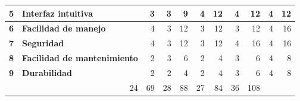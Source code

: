 \begin{table}[H]
\begin{tabular}{|c|c|c|c|c|c|c|c|c|c|c|}
		\hline
		\textbf{5} & \multicolumn{1}{l|}{\textbf{Interfaz intuitiva}} & \multicolumn{1}{r|}{3} & \multicolumn{1}{r|}{\cellcolor[rgb]{ .949,  .863,  .859}3} & \multicolumn{1}{r|}{9} & \multicolumn{1}{r|}{\cellcolor[rgb]{ .863,  .902,  .945}4} & \multicolumn{1}{r|}{12} & \multicolumn{1}{r|}{\cellcolor[rgb]{ .922,  .945,  .871}4} & \multicolumn{1}{r|}{12} & \multicolumn{1}{r|}{\cellcolor[rgb]{ .992,  .914,  .851}4} & \multicolumn{1}{r|}{12} \bigstrut\\
		\hline
		\textbf{6} & \multicolumn{1}{l|}{\textbf{Facilidad de manejo }} & \multicolumn{1}{r|}{4} & \multicolumn{1}{r|}{\cellcolor[rgb]{ .949,  .863,  .859}3} & \multicolumn{1}{r|}{12} & \multicolumn{1}{r|}{\cellcolor[rgb]{ .863,  .902,  .945}3} & \multicolumn{1}{r|}{12} & \multicolumn{1}{r|}{\cellcolor[rgb]{ .922,  .945,  .871}3} & \multicolumn{1}{r|}{12} & \multicolumn{1}{r|}{\cellcolor[rgb]{ .992,  .914,  .851}4} & \multicolumn{1}{r|}{16} \bigstrut\\
		\hline
		\textbf{7} & \multicolumn{1}{l|}{\textbf{Seguridad}} & \multicolumn{1}{r|}{4} & \multicolumn{1}{r|}{\cellcolor[rgb]{ .949,  .863,  .859}3} & \multicolumn{1}{r|}{12} & \multicolumn{1}{r|}{\cellcolor[rgb]{ .863,  .902,  .945}3} & \multicolumn{1}{r|}{12} & \multicolumn{1}{r|}{\cellcolor[rgb]{ .922,  .945,  .871}4} & \multicolumn{1}{r|}{16} & \multicolumn{1}{r|}{\cellcolor[rgb]{ .992,  .914,  .851}4} & \multicolumn{1}{r|}{16} \bigstrut\\
		\hline
		\textbf{8} & \multicolumn{1}{l|}{\textbf{Facilidad de mantenimiento}} & \multicolumn{1}{r|}{2} & \multicolumn{1}{r|}{\cellcolor[rgb]{ .949,  .863,  .859}3} & \multicolumn{1}{r|}{6} & \multicolumn{1}{r|}{\cellcolor[rgb]{ .863,  .902,  .945}2} & \multicolumn{1}{r|}{4} & \multicolumn{1}{r|}{\cellcolor[rgb]{ .922,  .945,  .871}3} & \multicolumn{1}{r|}{6} & \multicolumn{1}{r|}{\cellcolor[rgb]{ .992,  .914,  .851}4} & \multicolumn{1}{r|}{8} \bigstrut\\
		\hline
		\textbf{9} & \multicolumn{1}{l|}{\textbf{Durabilidad}} & \multicolumn{1}{r|}{2} & \multicolumn{1}{r|}{\cellcolor[rgb]{ .949,  .863,  .859}2} & \multicolumn{1}{r|}{4} & \multicolumn{1}{r|}{\cellcolor[rgb]{ .863,  .902,  .945}2} & \multicolumn{1}{r|}{4} & \multicolumn{1}{r|}{\cellcolor[rgb]{ .922,  .945,  .871}3} & \multicolumn{1}{r|}{6} & \multicolumn{1}{r|}{\cellcolor[rgb]{ .992,  .914,  .851}4} & \multicolumn{1}{r|}{8} \bigstrut\\
		\hline
		\rowcolor[rgb]{ .851,  .851,  .851} \multicolumn{3}{|c|}{\textbf{Suma}} & \multicolumn{1}{r|}{24} & \multicolumn{1}{r|}{69} & \multicolumn{1}{r|}{28} & \multicolumn{1}{r|}{88} & \multicolumn{1}{r|}{27} & \multicolumn{1}{r|}{84} & \multicolumn{1}{r|}{36} & \multicolumn{1}{r|}{108} \bigstrut\\

\end{tabular}
\end{table}
